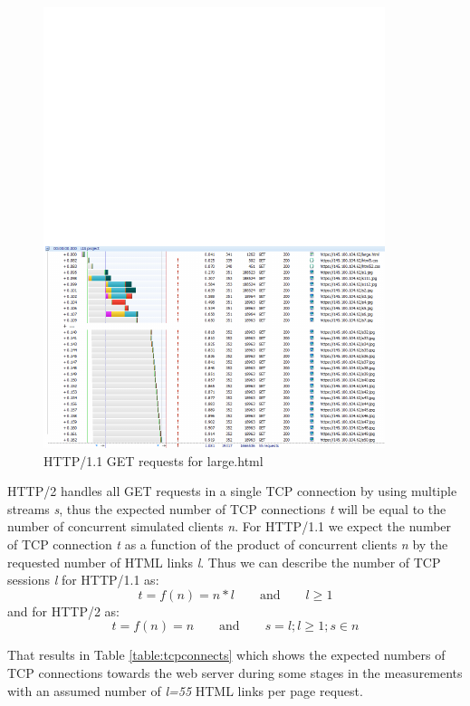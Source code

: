 \begin{figure}[H]
	\centering
	\includegraphics[scale=2,trim=0.0cm .0cm .0cm 4.5cm,clip]{images/http.pdf}
	\caption{HTTP/1.1 GET requests for large.html}
	\label{fig:httpwatch}
\end{figure}

HTTP/2 handles all GET requests in a single TCP connection by using multiple streams \textit{s}, thus the expected number of TCP connections \textit{t} will be equal to the number of concurrent simulated clients \textit{n}. For HTTP/1.1  we expect the number of TCP connection \textit{t} as a function of the product of concurrent clients \textit{n} by the requested number of HTML links \textit{l}. Thus we can describe the number of TCP sessions \textit{l} for HTTP/1.1 as: \begin{equation}
t=f(n)=n*l \qquad \text{and} \qquad l \geq 1\end{equation} and for HTTP/2 as: \begin{equation} t=f(n)=n \qquad \text{and} \qquad s=l; l\geq 1; s \in n \end{equation}

That results in Table \ref{table:tcpconnects} which shows the expected numbers of TCP connections towards the web server during some stages in the measurements with an assumed number of \textit{l=55} HTML links per page request.

